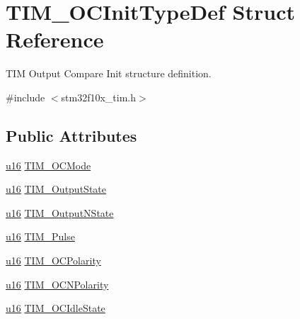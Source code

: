 \hypertarget{struct_t_i_m___o_c_init_type_def}{}\section{T\+I\+M\+\_\+\+O\+C\+Init\+Type\+Def Struct Reference}
\label{struct_t_i_m___o_c_init_type_def}


T\+IM Output Compare Init structure definition.  




{\ttfamily \#include $<$stm32f10x\+\_\+tim.\+h$>$}

\subsection*{Public Attributes}
\begin{DoxyCompactItemize}
\item 
\hyperlink{agilefox_2library_2inc_2stm32f10x__type_8h_a9e6c91d77e24643b888dbd1a1a590054}{u16} \hyperlink{struct_t_i_m___o_c_init_type_def_ab579643bb5aecb8e0d75af2e648cb5f6}{T\+I\+M\+\_\+\+O\+C\+Mode}
\item 
\hyperlink{agilefox_2library_2inc_2stm32f10x__type_8h_a9e6c91d77e24643b888dbd1a1a590054}{u16} \hyperlink{struct_t_i_m___o_c_init_type_def_af0c2c38c672effcb95b4ba8fc2896d1d}{T\+I\+M\+\_\+\+Output\+State}
\item 
\hyperlink{agilefox_2library_2inc_2stm32f10x__type_8h_a9e6c91d77e24643b888dbd1a1a590054}{u16} \hyperlink{struct_t_i_m___o_c_init_type_def_ae33a1ca0397eb06cbb51c32264cdea13}{T\+I\+M\+\_\+\+Output\+N\+State}
\item 
\hyperlink{agilefox_2library_2inc_2stm32f10x__type_8h_a9e6c91d77e24643b888dbd1a1a590054}{u16} \hyperlink{struct_t_i_m___o_c_init_type_def_ad2f91a27da1e29a3383952d5e287aab2}{T\+I\+M\+\_\+\+Pulse}
\item 
\hyperlink{agilefox_2library_2inc_2stm32f10x__type_8h_a9e6c91d77e24643b888dbd1a1a590054}{u16} \hyperlink{struct_t_i_m___o_c_init_type_def_aae7d72f8eb93085bb976167d30b138ff}{T\+I\+M\+\_\+\+O\+C\+Polarity}
\item 
\hyperlink{agilefox_2library_2inc_2stm32f10x__type_8h_a9e6c91d77e24643b888dbd1a1a590054}{u16} \hyperlink{struct_t_i_m___o_c_init_type_def_af92a49c44e3564bdbb1d1b7b621ecd98}{T\+I\+M\+\_\+\+O\+C\+N\+Polarity}
\item 
\hyperlink{agilefox_2library_2inc_2stm32f10x__type_8h_a9e6c91d77e24643b888dbd1a1a590054}{u16} \hyperlink{struct_t_i_m___o_c_init_type_def_a7a6994a1470c512ce6302a1f32f04f4a}{T\+I\+M\+\_\+\+O\+C\+Idle\+State}

\end{DoxyCompactItemize}
